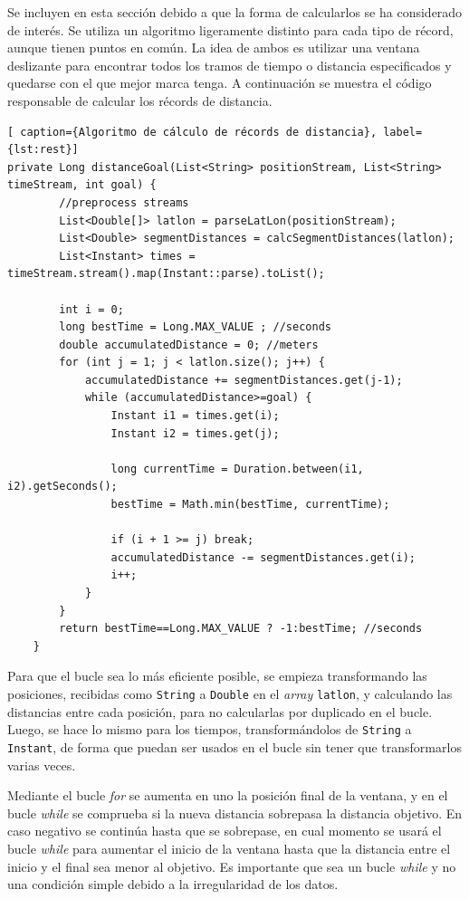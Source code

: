 Se incluyen en esta sección debido a que la forma de calcularlos se ha considerado de interés. Se utiliza un algoritmo ligeramente distinto para cada tipo de récord, aunque tienen puntos en común. La idea de ambos es utilizar una ventana deslizante para encontrar todos los tramos de tiempo o distancia especificados y quedarse con el que mejor marca tenga. A continuación se muestra el código responsable de calcular los récords de distancia.


\begin{lstlisting}[ caption={Algoritmo de cálculo de récords de distancia}, label={lst:rest}]
private Long distanceGoal(List<String> positionStream, List<String> timeStream, int goal) {
        //preprocess streams
        List<Double[]> latlon = parseLatLon(positionStream);
        List<Double> segmentDistances = calcSegmentDistances(latlon);
        List<Instant> times = timeStream.stream().map(Instant::parse).toList();

        int i = 0;
        long bestTime = Long.MAX_VALUE ; //seconds
        double accumulatedDistance = 0; //meters
        for (int j = 1; j < latlon.size(); j++) {
            accumulatedDistance += segmentDistances.get(j-1);
            while (accumulatedDistance>=goal) {
                Instant i1 = times.get(i);
                Instant i2 = times.get(j);

                long currentTime = Duration.between(i1, i2).getSeconds();
                bestTime = Math.min(bestTime, currentTime);

                if (i + 1 >= j) break;
                accumulatedDistance -= segmentDistances.get(i);
                i++;
            }
        }
        return bestTime==Long.MAX_VALUE ? -1:bestTime; //seconds
    }
\end{lstlisting}

Para que el bucle sea lo más eficiente posible, se empieza transformando las posiciones, recibidas como \texttt{String} a \texttt{Double} en el \textit{array} \texttt{latlon}, y calculando las distancias entre cada posición, para no calcularlas por duplicado en el bucle. Luego, se hace lo mismo para los tiempos, transformándolos de \texttt{String} a \texttt{Instant}, de forma que puedan ser usados en el bucle sin tener que transformarlos varias veces.

Mediante el bucle \textit{for} se aumenta en uno la posición final de la ventana, y en el bucle \textit{while} se comprueba si la nueva distancia sobrepasa la distancia objetivo. En caso negativo se continúa hasta que se sobrepase, en cual momento se usará el bucle \textit{while} para aumentar el inicio de la ventana hasta que la distancia entre el inicio y el final sea menor al objetivo. Es importante que sea un bucle \textit{while} y no una condición simple debido a la irregularidad de los datos.

